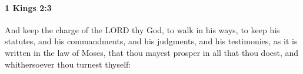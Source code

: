 
		\paragraph{1 Kings 2:3} %
			\label{1KINGS-2-3}

			And keep the charge of the LORD thy God, to walk in his ways, to keep his statutes, and his commandments, and his judgments, and his testimonies, as it is written in the law of Moses, that thou mayest prosper in all that thou doest, and whithersoever thou turnest thyself:


